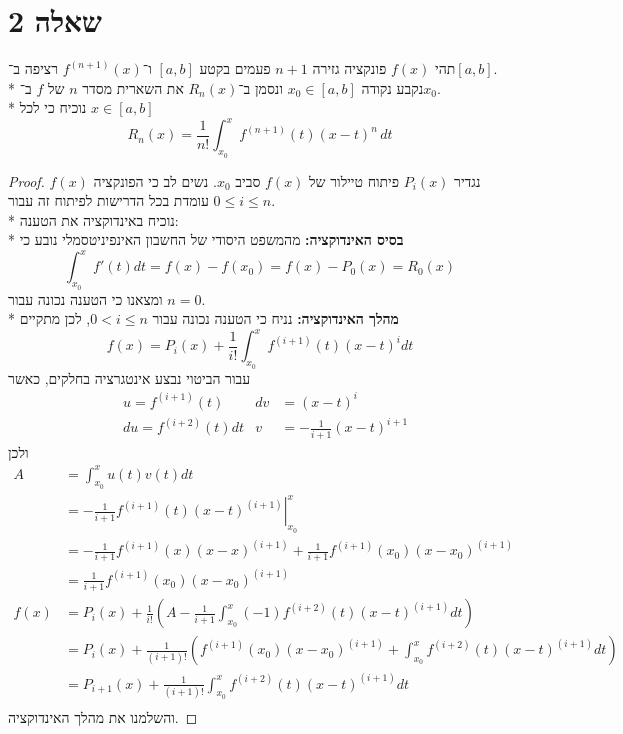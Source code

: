 \section{שאלה 2}
תהי $f(x)$ פונקציה גזירה $n + 1$ פעמים בקטע $[a, b]$ ו־$f^{(n + 1)}(x)$ רציפה ב־$[a, b]$. \\*
נקבע נקודה $x_0 \in [a, b]$ ונסמן ב־$R_n(x)$ את השארית מסדר $n$ של $f$ ב־$x_0$. \\*
נוכיח כי לכל $x \in [a, b]$
\[
	R_n(x) = \frac{1}{n!} \int_{x_0}^x f^{(n + 1)}(t){(x - t)}^n \, dt
\]
\begin{proof}
	נגדיר $P_i(x)$ פיתוח טיילור של $f(x)$ סביב $x_0$. נשים לב כי הפונקציה $f(x)$ עומדת בכל הדרישות לפיתוח זה עבור $0 \le i \le n$. \\*
	 נוכיח באינדוקציה את הטענה: \\*
	 \textbf{בסיס האינדוקציה:}
	 מהמשפט היסודי של החשבון האינפיניטסמלי נובע כי
	 \[
		 \int_{x_0}^x f'(t) dt = f(x) - f(x_0) = f(x) - P_0(x) = R_0(x)
	 \]
	 ומצאנו כי הטענה נכונה עבור $n = 0$. \\*
	 \textbf{מהלך האינדוקציה:}
	 נניח כי הטענה נכונה עבור $0 < i \le n$, לכן מתקיים
	 \[
		  f(x) = P_i(x) + \frac{1}{i!} \int_{x_0}^x f^{(i + 1)}(t) {(x - t)}^i dt
	 \]
	 עבור הביטוי נבצע אינטגרציה בחלקים, כאשר
	 \begin{align*}
		 & u = f^{(i + 1)}(t) & dv & = {(x - t)}^i \\
		 & du = f^{(i + 2)}(t) dt & v & = -\frac{1}{i + 1} {(x - t)}^{i + 1}
	 \end{align*}
	ולכן
	 \begin{align*}
		 A & = \int_{x_0}^x u(t) v(t) dt \\
		   & = \left. -\frac{1}{i + 1} f^{(i + 1)}(t){(x - t)}^{(i + 1)} \right|_{x_0}^x \\
		   & = -\frac{1}{i + 1} f^{(i + 1)}(x){(x - x)}^{(i + 1)} + \frac{1}{i + 1} f^{(i + 1)}(x_0){(x - x_0)}^{(i + 1)} \\
		   & = \frac{1}{i + 1} f^{(i + 1)}(x_0){(x - x_0)}^{(i + 1)} \\
		 f(x) & = P_i(x) + \frac{1}{i!} \left( A - \frac{1}{i + 1} \int_{x_0}^x (-1) f^{(i + 2)}(t) {(x - t)}^{(i + 1)} dt \right) \\
		 & = P_i(x) + \frac{1}{(i + 1)!} \left( f^{(i + 1)}(x_0){(x - x_0)}^{(i + 1)} + \int_{x_0}^x f^{(i + 2)}(t) {(x - t)}^{(i + 1)} dt \right) \\
		 & = P_{i + 1}(x) + \frac{1}{(i + 1)!} \int_{x_0}^x f^{(i + 2)}(t) {(x - t)}^{(i + 1)} dt \\
	 \end{align*}
	 והשלמנו את מהלך האינדוקציה.
\end{proof}


